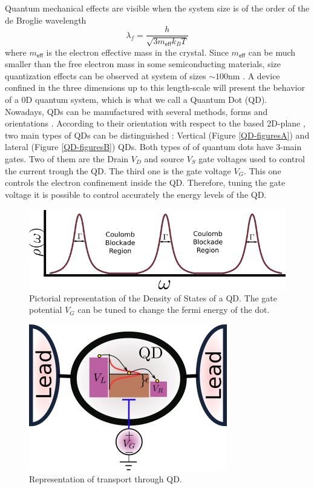 Quantum mechanical effects are visible when the system size is of the order of the de Broglie wavelength \citep[(1.1)]{bimberg_quantum_1999}
\[
\lambda_{f}=\frac{h}{\sqrt{3m_{\mathsf{eff}}k_{B}T}}
\]
 where $m_{\mathsf{eff}}$ is the electron effective mass in the crystal.
Since $m_{\mathsf{eff}}$ can be much smaller than the free electron mass in some semiconducting materials, size quantization effects can be observed at system of sizes $\sim100\mbox{nm}$ \citep[2.1]{sindel_numerical_2005}. A device confined in the three dimensions up to this length-scale will present the behavior of a $0$D quantum system, which is what we call a Quantum Dot (QD).\\

Nowadays, QDs can be manufactured with several methods, forms and orientations \citep{bimberg_quantum_1999}. According to their orientation with respect to the based 2D-plane , two main types of QDs can be distinguished : Vertical (Figure \ref{QD-figuresA}) and lateral (Figure \ref{QD-figuresB}) QDs. Both types of of quantum dots have $3$-main gates. Two of them are the Drain $V_D$ and source $V_S$ gate voltages used to control the current trough the QD. The third one is the gate voltage $V_G$. This one controls the electron confinement inside the QD. Therefore, tuning the gate voltage it is possible to control accurately the energy levels of the QD. 
\begin{figure}[tb]
    \centering
    \includegraphics[scale=0.65]{IMAGES/Preliminars/specDot.png}
    \caption{Pictorial representation of the Density of States of a QD. The gate potential $V_G$ can be tuned to change the fermi energy of the dot.  \protect{} }
    \label{fig:specDots}
\end{figure}


\begin{figure}[b]
    \centering
    \includegraphics[scale=0.65]{IMAGES/Preliminars/QD-Transport.png}
    \caption{ Representation of transport through QD.   \protect{} }
    \label{fig:QD-transport}
\end{figure}




